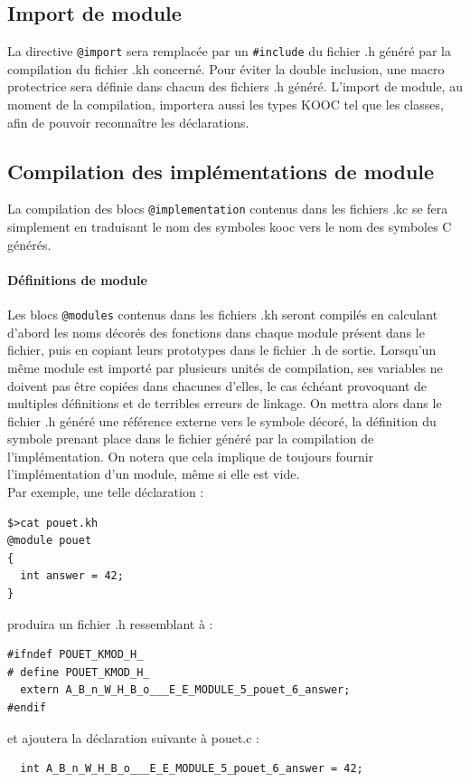 \documentclass[12pt,a4paper]{article}
\def\code#1{\texttt{#1}}
\begin{document}
\begin{NoHyper}
  \subsection{Import de module}
  La directive \code{@import} sera remplacée par un \code{\#include} du fichier .h généré par la compilation du fichier .kh concerné. Pour éviter la double inclusion, une macro protectrice sera définie dans chacun des fichiers .h généré. L'import de module, au moment de la compilation, importera aussi les types KOOC tel que les classes, afin de pouvoir reconnaître les déclarations.

\subsection{Compilation des implémentations de module}
  La compilation des blocs \code{@implementation} contenus dans les fichiers .kc se fera simplement en traduisant le nom des symboles kooc vers le nom des symboles C générés.
  \paragraph{Définitions de module\\}
  Les blocs \code{@modules} contenus dans les fichiers .kh seront compilés en calculant d'abord les noms décorés des fonctions dans chaque module présent dans le fichier, puis en copiant leurs prototypes dans le fichier .h de sortie.
Lorsqu'un même module est importé par plusieurs unités de compilation, ses variables ne doivent pas être copiées dans chacunes d'elles, le cas échéant provoquant de multiples définitions et de terribles erreurs de linkage. On mettra alors dans le fichier .h généré une référence externe vers le symbole décoré, la définition du symbole prenant place dans le fichier généré par la compilation de l'implémentation. On notera que cela implique de toujours fournir l'implémentation d'un module, même si elle est vide.\\
  Par exemple, une telle déclaration :
\begin{verbatim}
$>cat pouet.kh
@module pouet
{
  int answer = 42;
}
\end{verbatim}
produira un fichier .h ressemblant à :
\begin{verbatim}
#ifndef POUET_KMOD_H_
# define POUET_KMOD_H_
  extern A_B_n_W_H_B_o___E_E_MODULE_5_pouet_6_answer;
#endif
\end{verbatim}
et ajoutera la déclaration suivante à pouet.c :
\begin{verbatim}
  int A_B_n_W_H_B_o___E_E_MODULE_5_pouet_6_answer = 42;
\end{verbatim}



\end{NoHyper}
\end{document}
